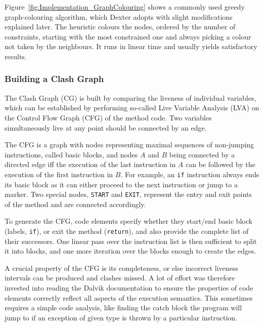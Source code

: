 \documentclass[12pt,twoside,notitlepage]{report}
\begin{document}
Figure~\ref{fig:Implementation_GraphColouring} shows a commonly used greedy graph-colouring algorithm, which Dexter adopts with slight modifications explained later. The heuristic colours the nodes, ordered by the number of constraints, starting with the most constrained one and always picking a colour not taken by the neighbours. It runs in linear time and usually yields satisfactory results.

\subsubsection{Building a Clash Graph}

The Clash Graph (CG) is built by comparing the liveness of individual variables, which can be established by performing so-called Live Variable Analysis (LVA) on the Control Flow Graph (CFG) of the method code. Two variables simultaneously live at any point should be connected by an edge.

The CFG is a graph with nodes representing maximal sequences of non-jumping instructions, called basic blocks, and nodes $A$ and $B$ being connected by a directed edge iff the execution of the last instruction in $A$ can be followed by the execution of the first instruction in $B$. For example, an \verb$if$ instruction always ends its basic block as it can either proceed to the next instruction or jump to a marker. Two special nodes, \verb$START$ and \verb$EXIT$, represent the entry and exit points of the method and are connected accordingly.

To generate the CFG, code elements specify whether they start/end basic block (labels, \verb$if$), or exit the method (\verb$return$), and also provide the complete list of their successors. One linear pass over the instruction list is then sufficient to split it into blocks, and one more iteration over the blocks enough to create the edges.

A crucial property of the CFG is its completeness, or else incorrect liveness intervals can be produced and clashes missed. A lot of effort was therefore invested into reading the Dalvik documentation to ensure the properties of code elements correctly reflect all aspects of the execution semantics. This sometimes requires a simple code analysis, like finding the catch block the program will jump to if an exception of given type is thrown by a particular instruction. 
\end{document}
